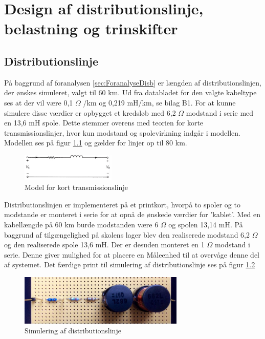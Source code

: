 
\chapter{Design af distributionslinje, belastning og trinskifter}

\section{Distributionslinje}
På baggrund af foranalysen \ref{sec:ForanalyseDisb} er længden af distributionslinjen, der ønskes simuleret, valgt til 60 km. Ud fra databladet for den valgte kabeltype ses at der  vil være 0,1 $\Omega$ /km og 0,219 mH/km, se bilag B1. For at kunne simulere disse værdier er opbygget et kredsløb med 6,2 $\Omega$ modstand i serie med en 13,6 mH spole. Dette stemmer overens med teorien for korte transmissionslinjer, hvor kun modstand og spolevirkning indgår i modellen. Modellen ses på figur \ref{fig:Kortlinjemodel} og gælder for linjer op til 80 km. 

\begin{figure}[htbp] %
	\centering
	\includegraphics[width=0.4\textwidth]{Figure/Kortlinjemodel2}
	\caption{Model for kort transmissionslinje}
	\label{fig:Kortlinjemodel}
\end{figure}


Distributionslinjen er implementeret på et printkort, hvorpå to spoler og to modstande er monteret i serie for at opnå de ønskede værdier for 'kablet'. Med en kabellængde på 60 km burde modstanden være 6 $\Omega$ og spolen 13,14 mH. På baggrund af tilgængelighed på skolens lager blev den realiserede modstand 6,2 $\Omega$ og den realiserede spole 13,6 mH. Der er desuden monteret en 1 $\Omega$ modstand i serie. Denne giver mulighed for at placere en Måleenhed til at overvåge denne del af systemet. Det færdige print til simulering af distributionslinje ses på figur \ref{fig:Disblinje}

\begin{figure}[H] 
	\centering
	\includegraphics[width=0.7\textwidth]{Figure/Distributionslinje}
	\caption{Simulering af distributionslinje}
	\label{fig:Disblinje}
\end{figure}
